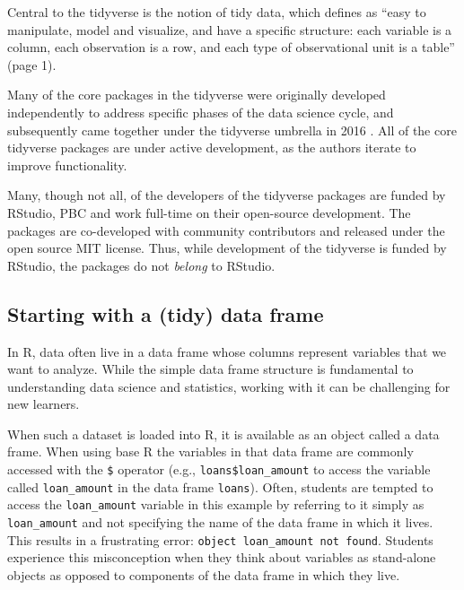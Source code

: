 \documentclass[12pt]{article}
\begin{document}
Central to the tidyverse is the notion of tidy data, which
\citet{wickham2014tidy} defines as ``easy to manipulate, model and
visualize, and have a specific structure: each variable is a column,
each observation is a row, and each type of observational unit is a
table'' (page 1).

Many of the core packages in the tidyverse were originally developed
independently to address specific phases of the data science cycle, and
subsequently came together under the tidyverse umbrella in 2016
\citep{smithdavid2016}. All of the core tidyverse packages are under
active development, as the authors iterate to improve functionality.

Many, though not all, of the developers of the tidyverse packages are
funded by RStudio, PBC and work full-time on their open-source
development. The packages are co-developed with community contributors
and released under the open source MIT license. Thus, while development
of the tidyverse is funded by RStudio, the packages do not \emph{belong}
to RStudio.

\hypertarget{starting-with-a-tidy-data-frame}{%
\subsection{Starting with a (tidy) data
frame}\label{starting-with-a-tidy-data-frame}}

In R, data often live in a data frame whose columns represent variables
that we want to analyze. While the simple data frame structure is
fundamental to understanding data science and statistics, working with
it can be challenging for new learners.

When such a dataset is loaded into R, it is available as an object
called a data frame. When using base R the variables in that data frame
are commonly accessed with the \texttt{\$} operator (e.g.,
\texttt{loans\$loan\_amount} to access the variable called
\texttt{loan\_amount} in the data frame \texttt{loans}). Often, students
are tempted to access the \texttt{loan\_amount} variable in this example
by referring to it simply as \texttt{loan\_amount} and not specifying
the name of the data frame in which it lives. This results in a
frustrating error:
\texttt{object\ \textquotesingle{}loan\_amount\textquotesingle{}\ not\ found}.
Students experience this misconception when they think about variables
as stand-alone objects as opposed to components of the data frame in
which they live.
\end{document}
